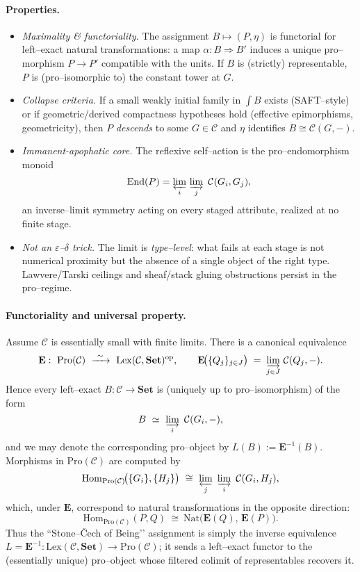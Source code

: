 \documentclass[11pt]{article}
\theoremstyle{upright}
\begin{document}
\begin{infobox}[title={The Stone–Čech of Being}]
\paragraph{Properties.}
\begin{itemize}[leftmargin=2em]
\item \emph{Maximality \& functoriality.} The assignment $B\mapsto (P,\eta)$ is functorial for left–exact natural transformations: a map $\alpha:B\Rightarrow B'$ induces a unique pro–morphism $P\to P'$ compatible with the units. If $B$ is (strictly) representable, $P$ is (pro–isomorphic to) the constant tower at $G$.
\item \emph{Collapse criteria.} If a small weakly initial family in $\int B$ exists (SAFT–style) or if geometric/derived compactness hypotheses hold (effective epimorphisms, geometricity), then $P$ \emph{descends} to some $G\in\mathcal C$ and $\eta$ identifies $B\cong \mathcal C(G,-)$. \citep{Rydh2015Noetherian}
\item \emph{Immanent-apophatic core.} The reflexive self–action is the pro–endomorphism monoid
\[
\mathrm{End}(P)=\varprojlim_{i}\,\varinjlim_{j}\ \mathcal C(G_i,G_j),
\]
an inverse–limit symmetry acting on every staged attribute, realized at no finite stage.
\item \emph{Not an $\varepsilon$–$\delta$ trick.} The limit is \emph{type–level}: what fails at each stage is not numerical proximity but the absence of a single object of the right type. Lawvere/Tarski ceilings and sheaf/stack gluing obstructions persist in the pro–regime.
\end{itemize}

\paragraph{Functoriality and universal property.}
Assume $\mathcal C$ is essentially small with finite limits.
There is a canonical equivalence
\[
\mathbf E:\ \mathrm{Pro}(\mathcal C)\ \xrightarrow{\ \sim\ }\ \mathrm{Lex}(\mathcal C,\mathbf{Set})^{\mathrm{op}},
\qquad 
\mathbf E\!\big(\{Q_j\}_{j\in J}\big)\;=\;\varinjlim_{j\in J}\,\mathcal C(Q_j,-).
\]
Hence every left–exact $B:\mathcal C\to\mathbf{Set}$ is (uniquely up to pro–isomorphism) of the form
\[
B\ \simeq\ \varinjlim_{i}\ \mathcal C(G_i,-),
\]
and we may denote the corresponding pro–object by $L(B):=\mathbf E^{-1}(B)$.
Morphisms in $\mathrm{Pro}(\mathcal C)$ are computed by
\[
\mathrm{Hom}_{\mathrm{Pro}(\mathcal C)}\!\big(\{G_i\},\{H_j\}\big)
\ \cong\ 
\varprojlim_{j}\ \varinjlim_{i}\ \mathcal C(G_i,H_j),
\]
which, under $\mathbf E$, correspond to natural transformations in the opposite direction:
\[
\mathrm{Hom}_{\mathrm{Pro}(\mathcal C)}(P,Q)\ \cong\ 
\mathrm{Nat}\!\big(\mathbf E(Q),\,\mathbf E(P)\big).
\]
Thus the “Stone–Čech of Being’’ assignment is simply the inverse equivalence
$L=\mathbf E^{-1}:\mathrm{Lex}(\mathcal C,\mathbf{Set})\to \mathrm{Pro}(\mathcal C)$; it sends a left–exact functor to the (essentially unique) pro–object whose filtered colimit of representables recovers it.


\end{infobox}
\end{document}
